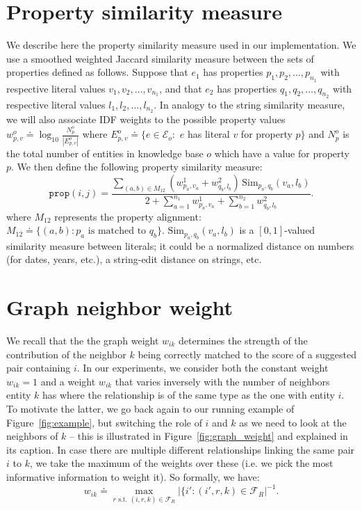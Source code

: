 \documentclass{sig-alternate}
\newcommand{\D}{\displaystyle}
\begin{document}
\begin{appendix}

\section{Property similarity measure} \label{ap:property}
We describe here the property similarity measure used in our implementation. We use a smoothed weighted Jaccard similarity measure between the sets of properties defined as follows. Suppose that $e_1$ has properties $p_1, p_2, \ldots, p_{n_1}$ with respective literal values $v_1, v_2, \ldots, v_{n_1}$, and that $e_2$ has properties $q_1, q_2, \ldots, q_{n_2}$ with respective literal values $l_1, l_2, \ldots, l_{n_2}$. In analogy to the string similarity measure, we will also associate IDF weights to the possible property values $w^o_{p,v} \doteq \log_{10} \frac{N^o_p}{|E^o_{p,v}|}$ where $E^o_{p,v} \doteq \{e \in \mathcal{E}_o :$ $e$ has literal $v$  for property $p\}$ and $N^o_p$ is the total number of entities in knowledge base $o$ which have a value for property $p$. We then define the following property similarity measure:
\begin{equation} \label{eq:property}
\mathtt{prop}(i,j) = \frac{\D \sum_{(a,b) \in M_{12} } (w^1_{p_a,v_a} + w^2_{q_b,l_b}) \,\mathrm{Sim}_{p_a,q_b}(v_a,l_b)}
    {\D 2 + \sum_{a=1}^{n_1} w^1_{p_a,v_a} + \sum_{b=1}^{n_2} w^2_{q_b,l_b}}.
\end{equation}
where $M_{12}$ represents the property alignment: $M_{12} \doteq \{(a,b) : p_a \textrm{ is matched to } q_b\}$. $\mathrm{Sim}_{p_a,q_b}(v_a,l_b)$ is a $[0,1]$-valued similarity measure between literals; it could be a normalized distance on numbers (for dates, years, etc.), a string-edit distance on strings, etc. %

\section{Graph neighbor weight} \label{ap:weights}
We recall that the the graph weight $w_{ik}$ determines the strength of the contribution of the neighbor $k$ being correctly matched to the score of a suggested pair containing $i$. In our experiments, we consider both the constant weight $w_{ik} = 1$ and a weight $w_{ik}$ that varies inversely with the number of neighbors entity $k$ has where the relationship is of the same type as the one with entity $i$. To motivate the latter, we go back again to our running example of Figure~\ref{fig:example}, but switching the role of $i$ and $k$ as we need to look at the neighbors of $k$ -- this is illustrated in Figure~\ref{fig:graph_weight} and explained in its caption. In case there are multiple different relationships linking the same pair $i$ to $k$, we take the maximum of the weights over these (i.e. we pick the most informative information to weight it). So formally, we have:
 \begin{equation} \label{eq:w_ik}
    w_{ik} \doteq \max_{r \textrm{ s.t. } (i,r,k) \in \mathcal{F}_R} | \{i' : (i',r,k) \in \mathcal{F}_R | ^{-1}  .
\end{equation}


\end{appendix}
\end{document}
